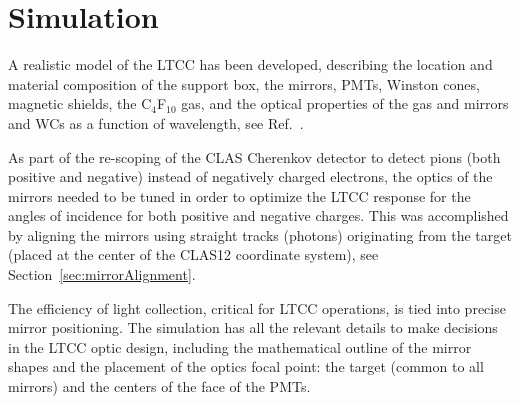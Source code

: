\section{Simulation}

A realistic model of the LTCC has been developed, describing the location and material composition of the support
box, the mirrors, PMTs, Winston cones, magnetic shields, the C$_4$F$_{10}$ gas, and the optical properties of the
gas and mirrors and WCs as a function of wavelength, see Ref.~\cite{sim-nim}.

As part of the re-scoping of the CLAS Cherenkov detector to detect pions (both positive and negative) instead of
negatively charged electrons, the optics of the mirrors needed to be tuned in order to optimize the LTCC response
for the angles of incidence for both positive and negative charges. This was accomplished by aligning the mirrors using
straight tracks (photons) originating from the target (placed at the center of the CLAS12 coordinate system), see
Section~\ref{sec:mirrorAlignment}.

The efficiency of light collection, critical for LTCC operations, is tied into precise mirror positioning.
The simulation has all the relevant details to make decisions in the LTCC optic design, including the
mathematical outline of the mirror shapes and the placement of the optics focal point: the target (common to all mirrors)
and the centers of the face of the PMTs.


